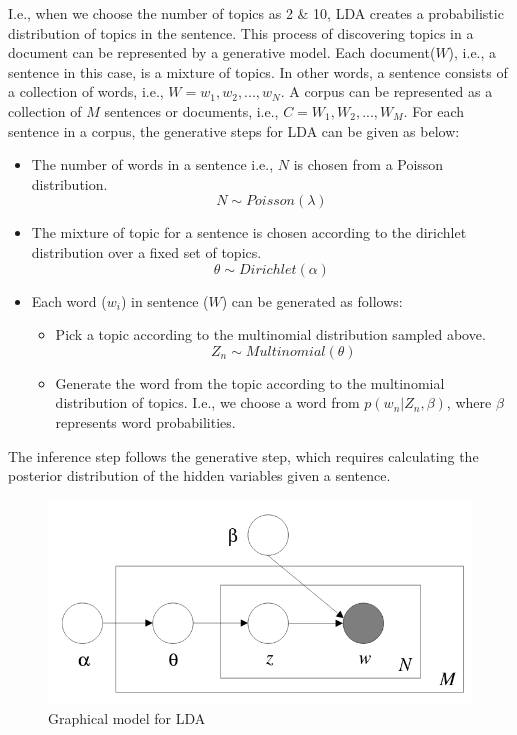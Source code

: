 I.e., when we choose the number of topics as 2 \& 10, LDA creates a probabilistic distribution of topics in the sentence. This process of discovering topics in a document can be represented by a generative model. Each document($W$), i.e., a sentence in this case, is a mixture of topics. In other words, a sentence consists of a collection of words, i.e., $W = {w_1,w_2, ..., w_N}$. A corpus can be represented as a collection of $M$ sentences or documents, i.e., $C = {W_1, W_2, ..., W_M}$. For each sentence in a corpus, the generative steps for LDA can be given as below:
\begin{itemize}
    \item The number of words in a sentence i.e., $N$ is chosen from a Poisson distribution.
    $$N \sim Poisson(\lambda)$$
    \item The mixture of topic for a sentence is chosen according to the dirichlet distribution over a fixed set of topics.
    $$\theta \sim Dirichlet(\alpha)$$
    \item Each word ($w_i$) in sentence ($W$) can be generated as follows:
    \begin{itemize}
        \item Pick a topic according to the multinomial distribution sampled above.
        $$Z_n \sim Multinomial(\theta)$$
        \item Generate the word from the topic according to the multinomial distribution of topics. I.e., we choose a word from $p(w_n|Z_n, \beta)$, where $\beta$ represents word probabilities.
    \end{itemize}
    
    
\end{itemize}

The inference step follows the generative step, which requires calculating the posterior distribution of the hidden variables given a sentence. 




\begin{figure}[t]
    \centering
    \includegraphics[width=\textwidth]{figures/LDA_plate_diagram.png}
 \caption{Graphical model for LDA~\citep{Blei:2003:LDA:944919.944937}}\label{fig:ldaplate}   
 \end{figure}
 
